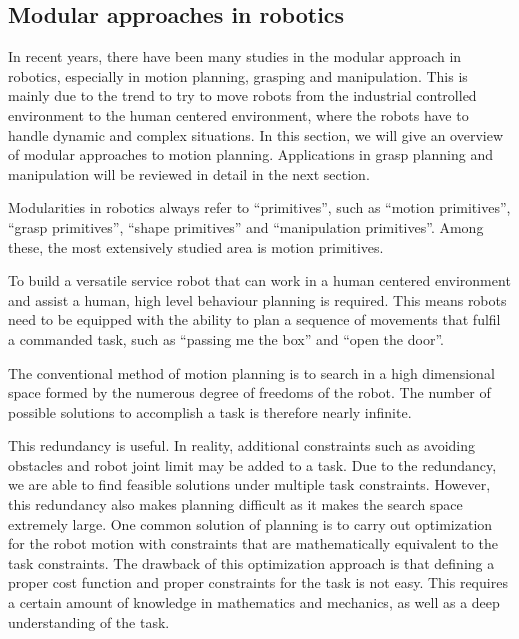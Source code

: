 





\subsection{Modular approaches in robotics}
\label{cha2:sec3:robotics}
In recent years, there have been many studies in the modular approach in robotics, especially in motion planning, grasping and manipulation. This is mainly due to the trend to try to move robots from the industrial controlled environment to the human centered environment, where the robots have to handle dynamic and complex situations. In this section, we will give an overview of modular approaches to motion planning. Applications in grasp planning and manipulation will be reviewed in detail in the next section.

Modularities in robotics always refer to ``primitives'', such as ``motion primitives'', ``grasp primitives'', ``shape primitives'' and ``manipulation primitives''. Among these, the most extensively studied area is motion primitives.

To build a versatile service robot that can work in a human centered environment and assist a human, high level behaviour planning is required. This means robots need to be equipped with the ability to plan a sequence of movements that fulfil a commanded task, such as ``passing me the box'' and ``open the door''.

The conventional method of motion planning is to search in a high dimensional space formed by the numerous degree of freedoms of the robot. The number of possible solutions to accomplish a task is therefore nearly infinite.

This redundancy is useful. In reality, additional constraints such as avoiding obstacles and robot joint limit may be added to a task. Due to the redundancy, we are able to find feasible solutions under multiple task constraints. However, this redundancy also makes planning difficult as it makes the search space extremely large. One common solution of planning is to carry out optimization for the robot motion with constraints that are mathematically equivalent to the task constraints.
The drawback of this optimization approach is that defining a proper cost function and proper constraints for the task is not easy. This requires a certain amount of knowledge in mathematics and mechanics, as well as a deep understanding of the task.

